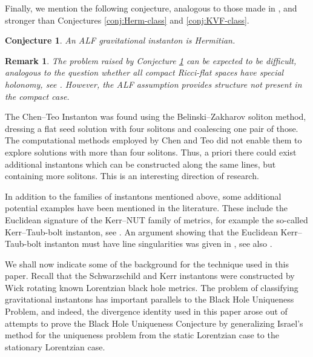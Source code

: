 \documentclass[a4paper,10pt,reqno]{amsart}
\theoremstyle{plain}
\newtheorem{conj}{Conjecture}
\newtheorem{remark}[thm]{Remark}
\numberwithin{equation}{section}
\begin{document}
Finally, we mention the following conjecture, analogous to those made in \cite{gibbons:1978:survey}, and stronger than Conjectures \ref{conj:Herm-class} and \ref{conj:KVF-class}. 
\begin{conj} \label{conj:strong-class}  
An ALF gravitational instanton is Hermitian. 
\end{conj} 
\begin{remark}  
The problem raised by Conjecture \ref{conj:strong-class} can be expected to be difficult, analogous to the question whether all compact Ricci-flat spaces have special holonomy, see \cite[p. 19]{MR2371700}. However, the ALF assumption provides structure not present in the compact case.  
\end{remark} 
The Chen--Teo Instanton was found using the Belinski--Zakha\-rov soliton method, dressing a flat seed solution with four solitons and coalescing one pair of those. The computational methods employed by Chen and Teo did not enable them to explore solutions with more than four solitons. Thus, a priori there could exist additional instantons which can be constructed along the same lines, but containing more solitons. This is an interesting direction of research. 

In addition to the families of instantons mentioned above, some additional potential examples have been mentioned in the literature. These include the Euclidean signature of the Kerr--NUT family of metrics, for example the so-called Kerr--Taub-bolt instanton, see \cite[\S III]{gibbons:perry:1980}. An argument showing that the Euclidean Kerr--Taub-bolt  instanton must have line singularities was given in \cite[\S 4.8] {2010NuPhB.838..207C}, see also \cite[Appendix A]{clement2020smarr}.

We shall now indicate some of the background for the technique used in this paper. Recall that the Schwarzschild and Kerr instantons were constructed by Wick rotating known Lorentzian black hole metrics. The problem of classifying gravitational instantons has important parallels to the Black Hole Uniqueness Problem, and indeed, the divergence identity used in this paper arose out of attempts to prove the Black Hole Uniqueness Conjecture by  generalizing Israel's method \cite{1967PhRv..164.1776I,MR398432,1977GReGr...8..695R} for the uniqueness problem from the static Lorentzian case to the stationary Lorentzian case. 
\end{document}
